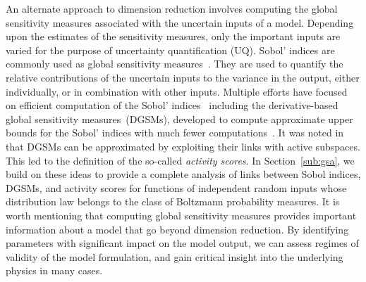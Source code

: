 An alternate approach to dimension reduction involves computing the global
sensitivity measures associated with the uncertain inputs of a model. Depending
upon the estimates of the sensitivity measures, only the important inputs are
varied for the purpose of uncertainty quantification (UQ). Sobol' indices are
commonly used as global sensitivity measures~\cite{Sobol:2001}. They are
used to quantify the relative contributions of the uncertain inputs to the variance
in the output, either individually, or in combination with other inputs. 
Multiple efforts have focused on efficient computation of the Sobol' 
indices~\cite{Sudret:2008,Plischke:2013,Tissot:2015,Li:2016} including the 
derivative-based global sensitivity measures~(DGSMs), developed to
compute approximate upper bounds for the Sobol' indices with much fewer
computations~\cite{Sobol:2009, Lamboni:2013}. It was noted
in~\cite{Diaz:2016,Constantine:2017} that DGSMs can be approximated by
exploiting their links with active subspaces. This led to the definition of the 
so-called \emph{activity scores}. In Section~\ref{sub:gsa}, we build on these
ideas to provide a complete analysis of links between Sobol indices, DGSMs, and
activity scores for functions of independent random inputs whose distribution
law belongs to the class of Boltzmann probability measures. 
It is worth mentioning that computing global sensitivity measures provides 
important information about a model that go beyond dimension reduction. By 
identifying parameters with significant impact on the model output, we can assess
regimes of validity of the model formulation, and gain critical insight into the
underlying physics in many cases. 
 

